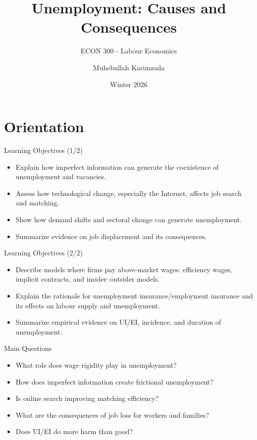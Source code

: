 \documentclass[aspectratio=169]{beamer}
\title{\textbf{Unemployment: Causes and Consequences}}
\subtitle{{\large ECON 300 - Labour Economics}}
\author{Muhebullah Karimzada}
\date{Winter 2026}
\begin{document}
\begin{frame}[plain]
  \titlepage
\end{frame}

\section{Orientation}

\begin{frame}{Learning Objectives (1/2)}
\transfade
\begin{itemize}
  \item Explain how imperfect information can generate the coexistence of unemployment and vacancies.
  \item Assess how technological change, especially the Internet, affects job search and matching.
  \item Show how demand shifts and sectoral change can generate unemployment.
  \item Summarize evidence on job displacement and its consequences.
\end{itemize}

\end{frame}

\begin{frame}{Learning Objectives (2/2)}
\transfade
\begin{itemize}
  \item Describe models where firms pay above-market wages: efficiency wages, implicit contracts, and insider--outsider models.
  \item Explain the rationale for unemployment insurance/employment insurance and its effects on labour supply and unemployment.
  \item Summarize empirical evidence on UI/EI, incidence, and duration of unemployment.
\end{itemize}


\end{frame}

\begin{frame}{Main Questions}
\transfade
\begin{itemize}
  \item What role does wage rigidity play in unemployment?
  \item How does imperfect information create frictional unemployment?
  \item Is online search improving matching efficiency?
  \item What are the consequences of job loss for workers and families?
  \item Does UI/EI do more harm than good?
\end{itemize}


\end{frame}
\end{document}

